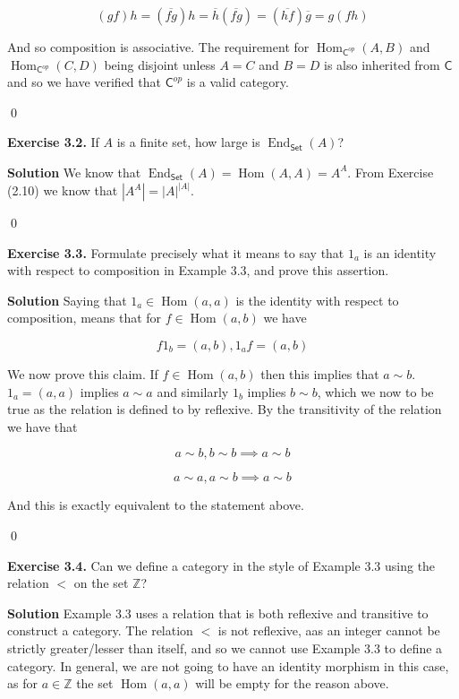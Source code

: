 \documentclass[titlepage]{article}
\newcommand{\Exercise}[1]{\textbf{Exercise #1}}
\newcommand{\Solution}{\textbf{Solution }}
\newcommand{\cat}[1]{\mathsf{#1}}
\newcommand{\Cat}{\cat{C}}
\DeclareMathOperator{\End}{End}
\DeclareMathOperator{\Hom}{Hom}
\begin{document}
\[ (gf)h = (\overline{fg})h = \overline{h}(\overline{fg}) = (\overline{hf})\overline{g} = g(fh) \]

And so composition is associative. The requirement for $\Hom_{\Cat^{op}}(A,B)$ and $\Hom_{\Cat^{op}}(C,D)$ being disjoint unless $A=C$ and $B=D$ is also inherited from $\Cat$ and so we have verified that $\Cat^{op}$ is a valid category.

\qed

\bigskip

\Exercise{3.2.} If $A$ is a finite set, how large is $\End_{\cat{Set}}(A)$?

\Solution We know that $\End_{\cat{Set}}(A) = \Hom(A,A) = A^A$. From Exercise (2.10) we know that $|A^A| = |A|^{|A|}$.

\qed

\bigskip

\Exercise{3.3.} Formulate precisely what it means to say that $1_a$ is an identity with respect to composition in Example 3.3, and prove this assertion.

\Solution Saying that $1_a \in \Hom(a,a)$ is the identity with respect to composition, means that for $f \in \Hom(a,b)$ we have

\[  f 1_b = (a,b), 1_a f = (a,b)  \]

We now prove this claim. If $f \in \Hom(a,b)$ then this implies that $a \sim b$. $1_a = (a,a)$ implies $a \sim a$ and similarly $1_b$ implies $b \sim b$, which we now to be true as the relation is defined to by reflexive. By the transitivity of the relation we have that

\[ a \sim b, b \sim b \implies a \sim b \]

\[ a \sim a, a \sim b \implies a \sim b \]

And this is exactly equivalent to the statement above.

\qed

\bigskip

\Exercise{3.4.} Can we define a category in the style of Example 3.3 using the relation $<$ on the set $\mathbb{Z}$?

\Solution Example 3.3 uses a relation that is both reflexive and transitive to construct a category. The relation $<$ is not reflexive, aas an integer cannot be strictly greater/lesser than itself, and so we cannot use Example 3.3 to define a category. In general, we are not going to have an identity morphism in this case, as for $a \in \mathbb{Z}$ the set $\Hom(a,a)$ will be empty for the reason above.
\end{document}
